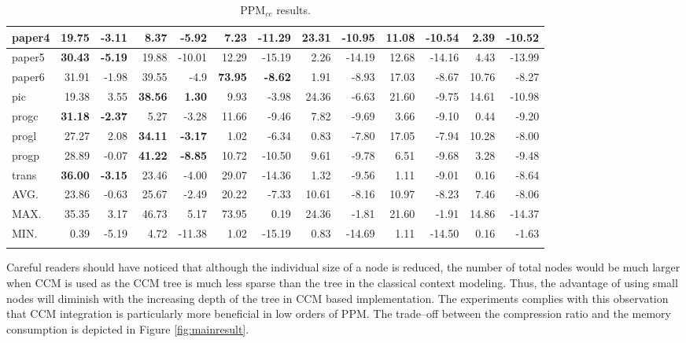 \documentclass[runningheads,a4paper]{llncs}
\begin{document}
\begin{table}
{\begin{tabular}{l|rr|rr|rr|rr|rr|rr|}
paper4 & \textbf{19.75} & \textbf{-3.11} & 8.37 & -5.92 & 7.23 & -11.29 & 23.31 & -10.95 & 11.08 & -10.54 & 2.39 &
-10.52 \\ \hline
paper5 & \textbf{30.43} & \textbf{-5.19} & 19.88 & -10.01 & 12.29 & -15.19 & 2.26 & -14.19 & 12.68 & -14.16 & 4.43 &
-13.99 \\ \hline
paper6 & 31.91 & -1.98 & 39.55 & -4.9 & \textbf{73.95} & \textbf{-8.62} & 1.91 & -8.93 & 17.03 & -8.67 & 10.76 & -8.27
\\ \hline
pic & 19.38 & 3.55 & \textbf{38.56} & \textbf{1.30} & 9.93 & -3.98 & 24.36 & -6.63 & 21.60 & -9.75 & 14.61 & -10.98 \\
\hline
progc & \textbf{31.18} & \textbf{-2.37} & 5.27 & -3.28 & 11.66 & -9.46 & 7.82 & -9.69 & 3.66 & -9.10 & 0.44 & -9.20 \\
\hline
progl & 27.27 & 2.08 & \textbf{34.11} & \textbf{-3.17} & 1.02 & -6.34 & 0.83 & -7.80 & 17.05 & -7.94 & 10.28 & -8.00 \\
\hline
progp & 28.89 & -0.07 & \textbf{41.22} & \textbf{-8.85} & 10.72 & -10.50 & 9.61 & -9.78 & 6.51 & -9.68 & 3.28 & -9.48 \\
\hline
trans & \textbf{36.00} & \textbf{-3.15} & 23.46 & -4.00 & 29.07 & -14.36 & 1.32 & -9.56 & 1.11 & -9.01 & 0.16 & -8.64 \\
\hline \hline
AVG.  & 23.86 & -0.63 & 25.67 & -2.49 & 20.22 & -7.33 & 10.61 & -8.16 & 10.97 & -8.23 & 7.46 & -8.06 \\ \hline
MAX.  & 35.35 &  3.17 & 46.73  &  5.17  & 73.95 & 0.19  & 24.36 & -1.81 & 21.60 & -1.91 & 14.86 & -14.37 \\ \hline
MIN.  &  0.39 & -5.19 &  4.72  & -11.38 &  1.02 & -15.19 & 0.83 & -14.69 & 1.11 & -14.50 & 0.16 & -1.63 \\ \hline
\multicolumn{13}{c}{} 
\end{tabular}
\caption{PPM$_{cc}$ results.}
\label{tab:results}
}
\end{table} 

Careful readers should have noticed  that although the individual size of a node is reduced, the number of total nodes
would be much larger when CCM is used as the CCM tree is much less sparse than the tree in the classical context
modeling.  
Thus, the advantage of using small nodes will diminish with the increasing depth of the tree in CCM based
implementation. The experiments complies with this observation that CCM integration is particularly more beneficial in
low orders of PPM. The trade--off between the compression ratio and the memory consumption is depicted in Figure
\ref{fig:mainresult}.
\end{document}
